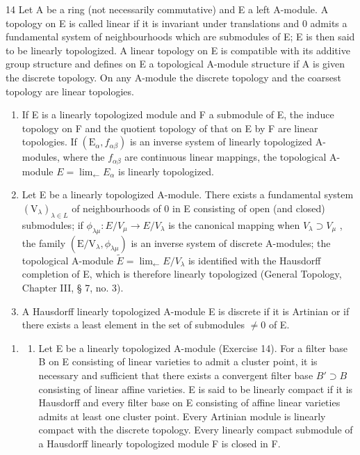 14 Let A be a ring (not necessarily commutative) and E a left A-module. A topology on E is called linear if it is invariant under translations and 0 admits a fundamental system of neighbourhoods which are submodules of E; E is then said to be linearly topologized. A linear topology on E is compatible with its additive group structure and defines on E a topological A-module structure if A is given the discrete topology. On any A-module the discrete topology and the coarsest topology are linear topologies.

\begin{enumerate}
\def\labelenumi{(\alph{enumi})}
\item
  If E is a linearly topologized module and F a submodule of E, the induce topology on F and the quotient topology of that on E by F are linear topologies. If \((\mathrm{E}_{\alpha}, f_{\alpha\beta})\) is an inverse system of linearly topologized A-modules, where the \(f_{\alpha\beta}\) are continuous linear mappings, the topological A-module \(E = \lim_{\leftarrow} E_{\alpha}\) is linearly topologized.
\item
  Let E be a linearly topologized A-module. There exists a fundamental system \((\mathrm{V}_{\lambda})_{\lambda \in L}\) of neighbourhoods of 0 in E consisting of open (and closed) submodules; if \(\phi_{\lambda\mu}: E/V_{\mu} \to E/V_{\lambda}\) is the canonical mapping when \(V_{\lambda} \supset V_{\mu}\) , the family \((\mathrm{E}/\mathrm{V}_{\lambda}, \phi_{\lambda\mu})\) is an inverse system of discrete A-modules; the topological A-module \(\tilde{E} = \lim_{\leftarrow} E/V_{\lambda}\) is identified with the Hausdorff completion of E, which is therefore linearly topologized (General Topology, Chapter III, § 7, no. 3).
\item
  A Hausdorff linearly topologized A-module E is discrete if it is Artinian or if there exists a least element in the set of submodules \(\neq0\) of E.
\end{enumerate}

\begin{enumerate}
\def\labelenumi{\arabic{enumi}.}
\setcounter{enumi}{14}
\tightlist
\item
  \begin{enumerate}
  \def\labelenumii{(\alph{enumii})}
  \tightlist
  \item
    Let E be a linearly topologized A-module (Exercise 14). For a filter base B on E consisting of linear varieties to admit a cluster point, it is necessary and sufficient that there exists a convergent filter base \(B' \supset B\) consisting of linear affine varieties. E is said to be linearly compact if it is Hausdorff and every filter base on E consisting of affine linear varieties admits at least one cluster point. Every Artinian module is linearly compact with the discrete topology. Every linearly compact submodule of a Hausdorff linearly topologized module F is closed in F.
  \end{enumerate}
\end{enumerate}

